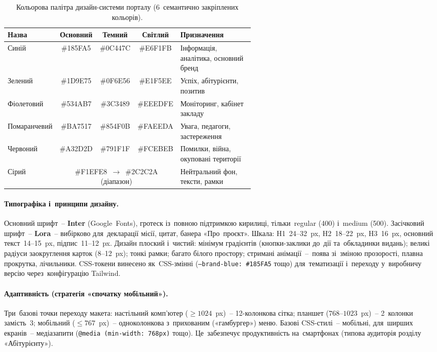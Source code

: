 \begin{table}[htbp]
\centering
\caption{Кольорова палітра дизайн-системи порталу (6~семантично закріплених кольорів).}
\label{tab:p3-palette}
\small
\setlength\tabcolsep{4pt}
\renewcommand{\arraystretch}{1.05}
\begin{tabular}{|p{0.14\linewidth}|c|c|c|p{0.42\linewidth}|}
\hline
\textbf{Назва} & \textbf{Основний} & \textbf{Темний} & \textbf{Світлий} & \textbf{Призначення} \\
\hline
Синій     & \#185FA5 & \#0C447C & \#E6F1FB & Інформація, аналітика, основний бренд \\
\hline
Зелений   & \#1D9E75 & \#0F6E56 & \#E1F5EE & Успіх, абітурієнти, позитив \\
\hline
Фіолетовий & \#534AB7 & \#3C3489 & \#EEEDFE & Моніторинг, кабінет закладу \\
\hline
Помаранчевий & \#BA7517 & \#854F0B & \#FAEEDA & Увага, педагоги, застереження \\
\hline
Червоний  & \#A32D2D & \#791F1F & \#FCEBEB & Помилки, війна, окуповані території \\
\hline
Сірий     & \multicolumn{3}{c|}{\#F1EFE8~$\to$~\#2C2C2A (діапазон)} & Нейтральний фон, тексти, рамки \\
\hline
\end{tabular}
\end{table}

\paragraph{Типографіка і~принципи дизайну.} Основний шрифт~-- \textbf{Inter} (Google~Fonts), гротеск із~повною підтримкою кирилиці, тільки~regular (400) і~medium (500). Засічковий шрифт~-- \textbf{Lora}~-- вибірково для~декларації місії, цитат, банера «Про~проєкт». Шкала: H1~24--32~px, H2~18--22~px, H3~16~px, основний текст~14--15~px, підпис~11--12~px. Дизайн плоский і~чистий: мінімум градієнтів (кнопки-заклики до~дії та~обкладинки видань); великі радіуси заокруглення карток (8--12~px); тонкі рамки; багато білого простору; стримані анімації~--~поява зі~зміною прозорості, плавна прокрутка, лічильники. CSS-токени винесено як~CSS-змінні (\texttt{--brand-blue:~\#185FA5} тощо) для~тематизації і~переходу у~виробничу версію через~конфігурацію Tailwind.

\paragraph{Адаптивність (стратегія «спочатку мобільний»).} Три~базові точки переходу макета: настільний комп'ютер ($\geq 1024$~px)~-- 12-колонкова сітка; планшет ($768$--$1023$~px)~-- 2~колонки замість~3; мобільний ($\leq 767$~px)~-- одноколонкова з~прихованим («гамбургер») меню. Базові CSS-стилі~-- мобільні, для~ширших екранів~-- медіазапити (\texttt{@media~(min-width:~768px)} тощо). Це~забезпечує продуктивність на~смартфонах (типова аудиторія розділу «Абітурієнту»).

